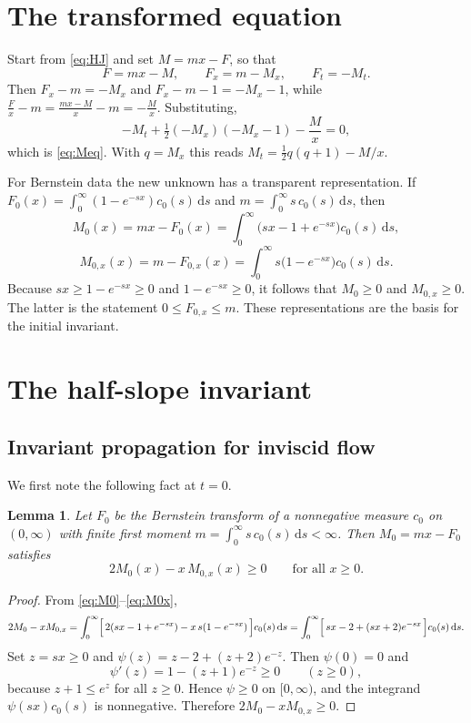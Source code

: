 \documentclass[12pt]{amsart}
\numberwithin{equation}{section}
\theoremstyle{plain}
\newtheorem{lemma}[theorem]{Lemma}
\theoremstyle{definition}
\newcommand{\dd}{\,\mathrm{d}}
\begin{document}
\section{The transformed equation}\label{sec:transformed}

Start from \eqref{eq:HJ} and set $M=mx-F$, so that
\[
	F=mx-M,\qquad F_x=m-M_x,\qquad F_t=-M_t .
\]
Then $F_x-m=-M_x$ and $F_x-m-1=-M_x-1$, while
$\tfrac{F}{x}-m=\tfrac{mx-M}{x}-m=-\tfrac{M}{x}$. Substituting,
\[
	-M_t+\tfrac12(-M_x)(-M_x-1)-\frac{M}{x}=0,
\]
which is \eqref{eq:Meq}. With $q=M_x$ this reads $M_t=\tfrac12 q(q+1)-M/x$.

For Bernstein data the new unknown has a transparent representation. If
$F_0(x)=\int_0^\infty(1-e^{-sx})c_0(s)\dd s$ and $m=\int_0^\infty
	s\,c_0(s)\dd s$,
then
\begin{equation}\label{eq:M0}
	M_0(x)=mx-F_0(x)=\int_0^\infty\bigl(sx-1+e^{-sx}\bigr)c_0(s)\dd s,
\end{equation}
\begin{equation}\label{eq:M0x}
	M_{0,x}(x)=m-F_{0,x}(x)=\int_0^\infty s\bigl(1-e^{-sx}\bigr)c_0(s)\dd s .
\end{equation}
Because $sx\ge1-e^{-sx} \geq 0$ and $1-e^{-sx}\geq 0$,
it follows that $M_0\ge0$ and $M_{0,x}\ge0$.
The latter is the statement $0\le F_{0,x}\le m$.
These representations are the basis for the initial invariant.

\section{The half-slope invariant}\label{sec:initial}
\subsection{Invariant propagation for inviscid flow}
We first note the following fact at $t=0$.
\begin{lemma}
	\label{lem:initial}
	Let $F_0$ be the Bernstein transform of a nonnegative measure $c_0$ on
	$(0,\infty)$ with finite first moment $m=\int_0^\infty s\,c_0(s)\dd s<\infty$.
	Then $M_0=mx-F_0$ satisfies
	\[
		2M_0(x)-x\,M_{0,x}(x)\ge0\qquad\text{for all }x\ge0 .
	\]
\end{lemma}

\begin{proof}
	From \eqref{eq:M0}--\eqref{eq:M0x},
	\[
		2M_0-x M_{0,x}
		=\int_0^\infty\Bigl[\,2(sx-1+e^{-sx})-x\,s(1-e^{-sx})\,\Bigr]c_0(s)\dd s
		=\int_0^\infty\Bigl[\,sx-2+(sx+2)e^{-sx}\,\Bigr]c_0(s)\dd s .
	\]
	Set $z=sx\ge0$ and $\psi(z)=z-2+(z+2)e^{-z}$. Then $\psi(0)=0$ and
	\[
		\psi'(z)=1-(z+1)e^{-z}\ge0\qquad(z\ge0),
	\]
	because $z+1\le e^{z}$ for all $z\ge0$. Hence $\psi\ge0$ on
	$[0,\infty)$, and the
	integrand $\psi(sx)c_0(s)$ is nonnegative. Therefore $2M_0-xM_{0,x}\ge0$.
\end{proof}
\end{document}
